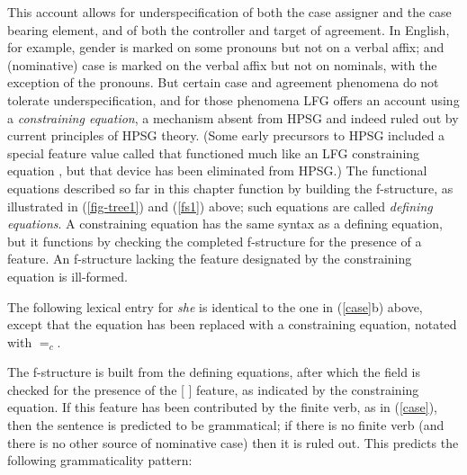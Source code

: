 This account allows for underspecification of both the case assigner and the case bearing element, and of both the controller and target of agreement.   In  English, for example, gender is marked on some pronouns but not on a verbal affix; and (nominative) case is marked on the verbal affix but not on  nominals, with the exception of the pronouns.  But certain case and agreement phenomena do not tolerate underspecification, and for those phenomena LFG offers an account using a \textit{constraining equation}, a mechanism absent from HPSG and indeed ruled out by current principles of HPSG theory.  (Some early precursors to HPSG included a special feature value called  that functioned much like an LFG constraining equation \citep[36-7]{Shieber86a}, but that device has been eliminated from HPSG.)  The functional equations described so far in this chapter function by building the f-structure, as illustrated in (\ref{fig-tree1}) and (\ref{fs1}) above; such equations are called \textit{defining equations}.  A constraining equation has the same syntax as a defining equation, but it functions by checking the completed f-structure for the presence of a feature.  An f-structure lacking the feature designated by the constraining equation is ill-formed.  

The following lexical entry for \textit{she} is identical to the one in (\ref{case}b) above, except that the  equation has been replaced with a constraining equation, notated with $=_c$.  

\ea
\label{constrain}
{\qquad{} }
\z
The f-structure is built from the defining equations, after which the \subj{} field is checked for the presence of the [ ] feature, as indicated by the constraining equation.  If this feature has been contributed by the finite verb, as in (\ref{case}), then the sentence is predicted to be grammatical; if there is no finite verb (and there is no other source of nominative case) then it is ruled out.  This predicts the following grammaticality pattern:

